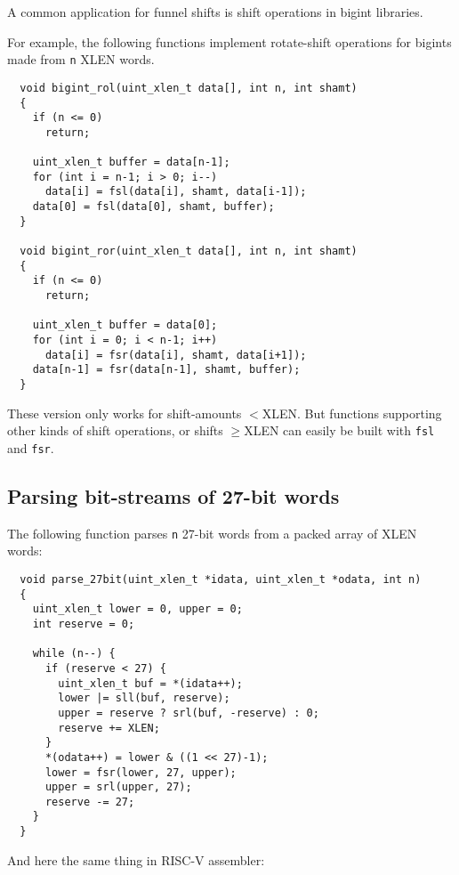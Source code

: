 A common application for funnel shifts is shift operations in bigint libraries.

For example, the following functions implement rotate-shift operations
for bigints made from {\tt n} XLEN words.

\begin{minipage}{\linewidth}
\begin{verbatim}
  void bigint_rol(uint_xlen_t data[], int n, int shamt)
  {
    if (n <= 0)
      return;

    uint_xlen_t buffer = data[n-1];
    for (int i = n-1; i > 0; i--)
      data[i] = fsl(data[i], shamt, data[i-1]);
    data[0] = fsl(data[0], shamt, buffer);
  }

  void bigint_ror(uint_xlen_t data[], int n, int shamt)
  {
    if (n <= 0)
      return;

    uint_xlen_t buffer = data[0];
    for (int i = 0; i < n-1; i++)
      data[i] = fsr(data[i], shamt, data[i+1]);
    data[n-1] = fsr(data[n-1], shamt, buffer);
  }
\end{verbatim}
\end{minipage}

These version only works for shift-amounts $<$XLEN. But functions supporting
other kinds of shift operations, or shifts $\ge$XLEN can easily be built
with {\tt fsl} and {\tt fsr}.

\subsection{Parsing bit-streams of 27-bit words}

The following function parses {\tt n} 27-bit words from a packed array of XLEN words:

\begin{minipage}{\linewidth}
\begin{verbatim}
  void parse_27bit(uint_xlen_t *idata, uint_xlen_t *odata, int n)
  {
    uint_xlen_t lower = 0, upper = 0;
    int reserve = 0;

    while (n--) {
      if (reserve < 27) {
        uint_xlen_t buf = *(idata++);
        lower |= sll(buf, reserve);
        upper = reserve ? srl(buf, -reserve) : 0;
        reserve += XLEN;
      }
      *(odata++) = lower & ((1 << 27)-1);
      lower = fsr(lower, 27, upper);
      upper = srl(upper, 27);
      reserve -= 27;
    }
  }
\end{verbatim}
\end{minipage}

And here the same thing in RISC-V assembler:

